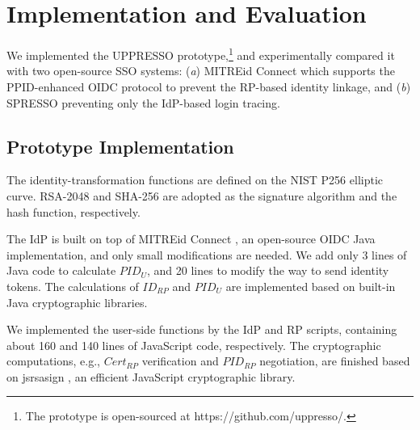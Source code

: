 \section{Implementation and Evaluation}
\label{sec:implementation}
We implemented the UPPRESSO prototype,\footnote{The prototype is open-sourced at https://github.com/uppresso/.}
 and experimentally compared it
 with two open-source SSO systems:
  (\emph{a}) MITREid Connect \cite{MITREid}
    which supports the PPID-enhanced OIDC protocol to prevent the RP-based identity linkage,
     and (\emph{b}) SPRESSO \cite{SPRESSO} preventing only the IdP-based login tracing.


\subsection{Prototype Implementation}
\label{subsec:proto-imple}
The identity-transformation functions are defined on
        the NIST P256 elliptic curve.
RSA-2048 and SHA-256 are adopted as the signature algorithm and the hash function, respectively.

The IdP is built on top of MITREid Connect \cite{MITREid},
    an open-source OIDC Java implementation, %
    and only small modifications are needed.
We add only 3 lines of Java code to calculate $PID_U$,
    and 20 lines to modify the way to send identity tokens.
The calculations of $ID_{RP}$ and $PID_U$ are implemented based on built-in Java cryptographic libraries.

We implemented the user-side functions by the IdP and RP scripts,
     containing about 160 and 140 lines of JavaScript code, respectively.
The cryptographic computations, e.g., $Cert_{RP}$ verification and $PID_{RP}$ negotiation, are finished based on jsrsasign \cite{jsrsasign}, an efficient JavaScript cryptographic library.

